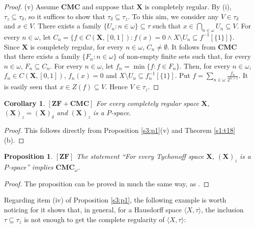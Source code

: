 \documentclass[12pt,twoside,leqno]{article}
\theoremstyle{plain}
\newtheorem{proposition}[theorem]{Proposition}
\newtheorem{corollary}[theorem]{Corollary}
\theoremstyle{definition}
\theoremstyle{remark}
\begin{document}
\begin{proof}
	(v) Assume $\mathbf{CMC}$ and suppose that $\mathbf{X}$ is completely regular. By (i), $\tau_z\subseteq\tau_{\delta}$, so it suffices to show that $\tau_{\delta}\subseteq\tau_z$. To this aim, we consider any $V\in\tau_{\delta}$ and $x\in V$. There exists a family $\{U_n: n\in\omega\}\subseteq\tau$ such that $x\in\bigcap\limits_{n\in\omega}U_n\subseteq V$. For every $n\in\omega$, let $C_n=\{f\in C(\mathbf{X}, [0,1]): f(x)=0\wedge X\setminus U_n\subseteq f^{-1}[\{1\}]\}$. Since $\mathbf{X}$ is completely regular, for every $n\in\omega$, $C_n\neq\emptyset$. It follows from $\mathbf{CMC}$ that there exists a family $\{F_n: n\in\omega\}$ of non-empty finite sets such that, for every $n\in\omega$, $F_n\subseteq C_n$. For every $n\in\omega$, let $f_n=\min\{f: f\in F_n\}$. Then, for every $n\in\omega$, $f_n\in C(\mathbf{X}, [0,1])$, $f_n(x)=0$ and $X\setminus U_n\subseteq f_n^{-1}[\{1\}]$. Put $f=\sum\limits_{n\in\omega}\frac{f_n}{2^{n+1}}$. It is easily seen that $x\in Z(f)\subseteq V$. Hence $V\in\tau_z$.
\end{proof}

\begin{corollary}
	\label{s3:c2}
	$[\mathbf{ZF+CMC}]$ For every completely regular space $\mathbf{X}$, $(\mathbf{X})_z=(\mathbf{X})_{\delta}$ and $(\mathbf{X})_z$ is a $P$-space. 
\end{corollary}
\begin{proof}
	This follows directly from Proposition \ref{s3:p1}(v) and Theorem \ref{s1:t18}(b).
\end{proof}

\begin{proposition}
	\label{s3:p3}
	$[\mathbf{ZF}]$ The statement ``For every Tychonoff space $\mathbf{X}$, $(\mathbf{X})_z$ is a $P$-space'' implies $\mathbf{CMC}_{\omega}$. 
\end{proposition}
\begin{proof}
	The proposition can be proved in much the same way, as \cite[Theorem 4.10]{kow}.
\end{proof}

Regarding item (iv) of Proposition \ref{s3:p1}, the following example is worth noticing for it shows that, in general, for a Hausdorff space $\langle X, \tau\rangle$,  the inclusion $\tau\subseteq \tau_z$ is not enough to get the complete regularity of $\langle X, \tau\rangle$:
\end{document}

